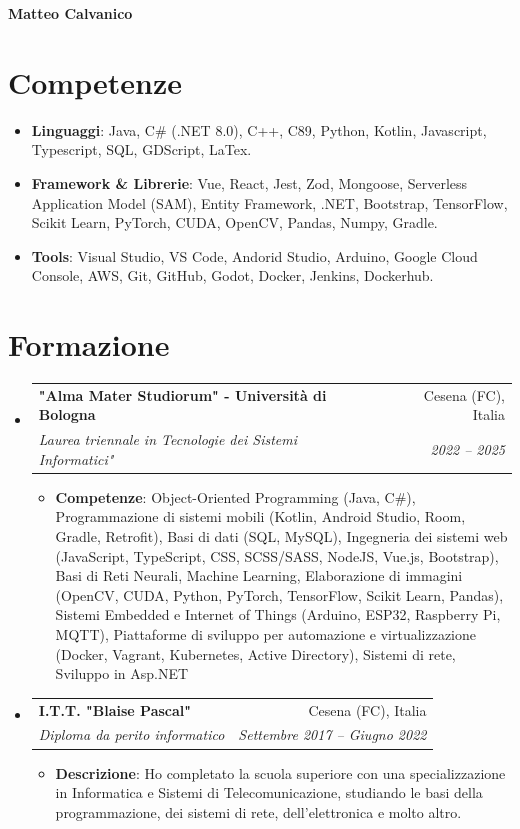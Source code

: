 \documentclass[letterpaper,11pt]{article}
\makeatletter
\newcommand{\resumeItem}[2]{
  \item\small{
    \textbf{#1}{: #2 \vspace{-2pt}}
  }
}
\newcommand{\resumeSubheading}[4]{
  \vspace{-1pt}\item
    \begin{tabular*}{0.97\textwidth}{l@{\extracolsep{\fill}}r}
      \textbf{#1} & #2 \\
      \textit{\small#3} & \textit{\small #4} \\
    \end{tabular*}\vspace{-5pt}
}
\newcommand{\resumeSubHeadingListStart}{\begin{itemize}[leftmargin=*]}
\newcommand{\resumeSubHeadingListEnd}{\end{itemize}}
\newcommand{\resumeItemListStart}{\begin{itemize}}
\newcommand{\resumeItemListEnd}{\end{itemize}\vspace{-5pt}}
\makeatother
\begin{document}
\setlength{\footskip}{5pt}
\centering\textbf{\Large Matteo Calvanico} \\
  \vspace{0.25in}

\section{Competenze}
\resumeSubHeadingListStart
  \item{
    \textbf{Linguaggi}{: Java, C\# (.NET 8.0), C++, C89, Python, Kotlin, Javascript, Typescript, SQL, GDScript, LaTex.}
    \hfill
    }
  \item{
    \textbf{Framework \& Librerie}{: Vue, React, Jest, Zod, Mongoose, Serverless Application Model (SAM), Entity Framework, .NET, Bootstrap, TensorFlow, Scikit Learn, PyTorch, CUDA, OpenCV, Pandas, Numpy, Gradle.}
    \hfill
    }
  \item{
    \textbf{Tools}{: Visual Studio, VS Code, Andorid Studio, Arduino, Google Cloud Console, AWS, Git, GitHub, Godot, Docker, Jenkins, Dockerhub.}
    \hfill
    }
  \resumeSubHeadingListEnd

\section{Formazione}
  \resumeSubHeadingListStart
    \resumeSubheading
      {"Alma Mater Studiorum" - Università di Bologna}{Cesena (FC), Italia}
      {Laurea triennale in Tecnologie dei Sistemi Informatici"}{2022 -- 2025}
      \resumeItemListStart
          \resumeItem{Competenze}{Object-Oriented Programming (Java, C\#), Programmazione di sistemi mobili (Kotlin, Android Studio, Room, Gradle, Retrofit), Basi di dati (SQL, MySQL), Ingegneria dei sistemi web (JavaScript, TypeScript, CSS, SCSS/SASS, NodeJS, Vue.js, Bootstrap), Basi di Reti Neurali, Machine Learning, Elaborazione di immagini (OpenCV, CUDA, Python, PyTorch, TensorFlow, Scikit Learn, Pandas), 
          Sistemi Embedded e Internet of Things (Arduino, ESP32, Raspberry Pi, MQTT), Piattaforme di sviluppo per automazione e virtualizzazione (Docker, Vagrant, Kubernetes, Active Directory), Sistemi di rete, Sviluppo in Asp.NET}
      \resumeItemListEnd
    \resumeSubheading
      {I.T.T. "Blaise Pascal"}{Cesena (FC), Italia}
      {Diploma da perito informatico}{Settembre 2017 -- Giugno 2022}
    \resumeItemListStart
	\resumeItem{Descrizione}{Ho completato la scuola superiore con una specializzazione in Informatica e Sistemi di Telecomunicazione, studiando le basi della programmazione, dei sistemi di rete, dell'elettronica e molto altro.}
    \resumeItemListEnd
  \resumeSubHeadingListEnd
\end{document}
